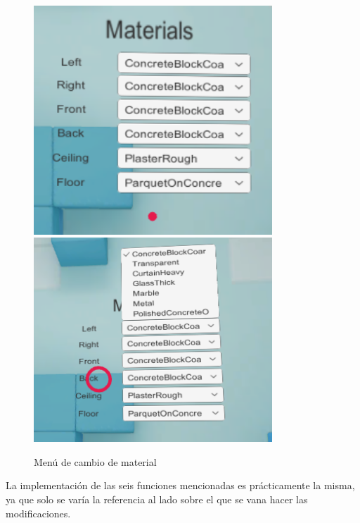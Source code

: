 \begin{figure}[htb]
	\centering
	\includegraphics[width=0.8\textwidth]{./imagenes/materialMenu}
	\includegraphics[width=0.8\textwidth]{./imagenes/materialMenuDeploy}
	\caption{Menú de cambio de material}
\end{figure}
\FloatBarrier

\quad La implementación de las seis funciones mencionadas es prácticamente la misma, ya que solo se varía la referencia al lado sobre el que se vana hacer las modificaciones.\\

